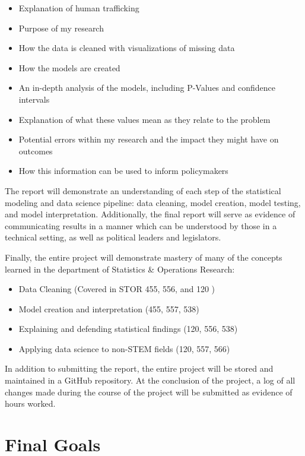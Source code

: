\documentclass{article} %
\begin{document}
\begin{itemize}
	\item Explanation of human trafficking
	\item Purpose of my research 
	\item How the data is cleaned with visualizations of missing data
	\item How the models are created
	\item An in-depth analysis of the models, including P-Values and confidence intervals
	\item Explanation of what these values mean as they relate to the problem
	\item Potential errors within my research and the impact they might have on outcomes
	\item How this information can be used to inform policymakers
	
\end{itemize}

The report will demonstrate an understanding of each step of the statistical modeling and data science pipeline: data cleaning, model creation, model testing, and model interpretation. Additionally, the final report will serve as evidence of communicating results in a manner which can be understood by those in a technical setting, as well as political leaders and legislators. 

Finally, the entire project will demonstrate mastery of many of the concepts learned in the department of Statistics \& Operations Research:

\begin{itemize}
	\item Data Cleaning (Covered in STOR 455, 556, and 120 )
	\item Model creation and interpretation (455, 557, 538)
	\item Explaining and defending statistical findings (120, 556, 538)
	\item Applying data science to non-STEM fields (120, 557, 566)
\end{itemize}

In addition to submitting the report, the entire project will be stored and maintained in a GitHub repository. At the conclusion of the project, a log of all changes made during the course of the project will be submitted as evidence of hours worked.


\section{Final Goals}
\end{document}
